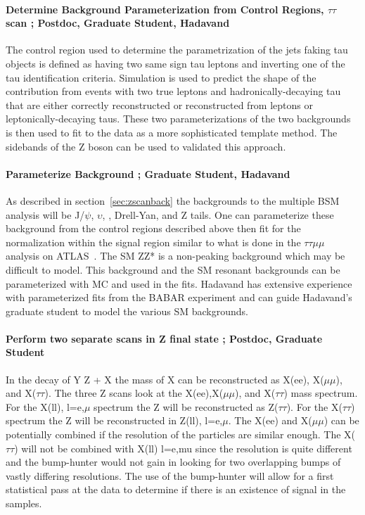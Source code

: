 \paragraph{Determine Background Parameterization from Control Regions, $\tau\tau$ scan ;  Postdoc, Graduate Student, Hadavand}
The control region used to determine the parametrization of the jets faking tau objects is defined as having two same sign tau leptons and inverting one of the tau identification criteria.
Simulation is used to predict the shape of the contribution from events with two true leptons and hadronically-decaying tau that are either correctly reconstructed or reconstructed
from leptons or leptonically-decaying taus.  These two parameterizations of the two backgrounds is then used to fit to the data as a more sophisticated template method.  The sidebands of the Z boson
can be used to validated this approach.

\paragraph{Parameterize Background ;  Graduate Student, Hadavand} %
As described in section~\ref{sec:zscanback} the backgrounds to the multiple BSM analysis  will be J/$\psi$, $\upsilon$, \ttbar, Drell-Yan, and Z tails.  One can 
parameterize these background from the control regions described above then fit for the normalization within the signal region similar to what is done in the
$\tau\tau \mu \mu$ analysis on ATLAS~\cite{tautaumumu}.  The SM ZZ* is a non-peaking background which may be difficult to model. This background and the SM resonant backgrounds 
can be parameterized with MC and used in the fits. Hadavand has extensive experience with parameterized fits from the BABAR experiment and can guide Hadavand's graduate student to model the various SM backgrounds.

\paragraph{Perform two separate scans in Z final state ;  Postdoc, Graduate Student} %
In the decay of Y \too Z + X the mass of X can be reconstructed as X(ee), X($\mu\mu$), and X($\tau\tau$).  
The three Z scans look at the X(ee),X($\mu\mu$), and X($\tau\tau$) mass spectrum. For the X(ll), l=e,$\mu$ spectrum the Z will be reconstructed as Z($\tau\tau$).  For the X($\tau\tau$) spectrum the Z will be reconstructed in Z(ll), l=e,$\mu$.  
The X(ee) and X($\mu\mu$) can be potentially combined if the resolution of the particles are similar enough.  The X($\tau\tau$) will not be combined with X(ll) l=e,mu since the resolution is quite different and the bump-hunter would not gain in looking for two overlapping bumps of vastly differing resolutions.
The use of the bump-hunter will allow for a first statistical pass at the data to determine if there is an existence of signal in the samples.  


